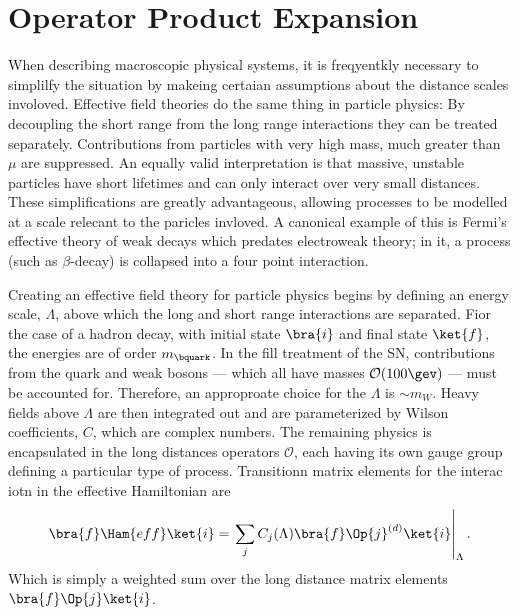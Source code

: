 \section{Operator Product Expansion}



When describing macroscopic physical systems, it is freqyentkly necessary to simplilfy the situation by makeing
certaian assumptions about the distance scales involoved.
Effective field theories do the same thing in particle physics:
By decoupling the short range from the long range interactions they can be treated separately.
Contributions from particles with very high mass, much greater than $\mu$ are suppressed.
An equally valid interpretation is that massive, unstable particles have short lifetimes and can
only interact over very small distances.
These simplifications are greatly advantageous, allowing processes to be modelled at a scale
relecant to the paricles invloved.
A canonical example of this is Fermi's effective theory of weak decays which predates electroweak
theory; in it, a process (such as $\beta$-decay) is collapsed into a four point interaction.

Creating an effective field theory for particle physics begins by defining an energy scale,
$\Lambda$, above which the long and short range interactions are separated.
Fior the case of a \bquark hadron decay, with initial state $\bra{i}$ and final state $\ket{f}$,
the energies are of order $m_\bquark$.
In the fill treatment of the SN, contributions from the \tquark quark and weak bosons --- which all
have masses $\mathcal{O}(100\gev)$ --- must be accounted for.
Therefore, an approproate choice for the $\Lambda$ is $\sim m_W$.
Heavy fields above $\Lambda$ are then integrated out and are parameterized by Wilson coefficients,
$C$, which are complex numbers.
The remaining physics is encapsulated in the long distances operators $\mathcal{O}$, each having
its own gauge group defining a particular type of process.
Transitionn matrix elements for the interac iotn in the effective Hamiltonian are
\begin{equation}
  \bra{f}\Ham{eff}\ket{i} =
  \left.
  \sum_j C_j(\Lambda)\bra{f}\Op{j}^{(d)}\ket{i}\right|_{\Lambda}.
\end{equation}
Which is simply a weighted sum over the long distance matrix elements $\bra{f}\Op{j}\ket{i}$.

